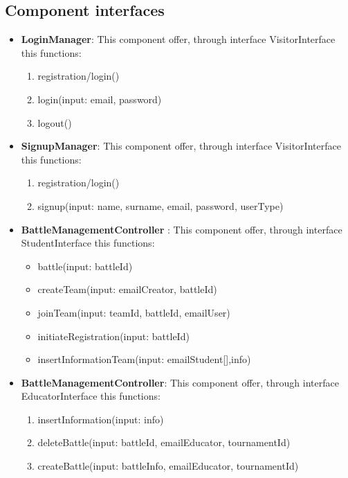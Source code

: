 \subsection{Component interfaces}

\begin{itemize}
    \item \textbf{LoginManager}: This component offer, through interface VisitorInterface this functions:
    \begin{enumerate}
        \item registration/login()
        \item login(input: email, password)
        \item logout()
    \end{enumerate}
    \item \textbf{SignupManager}: This component offer, through interface VisitorInterface this functions:
    \begin{enumerate}
        \item registration/login()
        \item signup(input: name, surname, email, password, userType)
    \end{enumerate}
    \item \textbf{BattleManagementController} : This component offer, through interface StudentInterface this functions:
    \begin{itemize}
        \item battle(input: battleId)
        \item createTeam(input: emailCreator, battleId)
        \item joinTeam(input: teamId, battleId, emailUser)
        \item initiateRegistration(input: battleId)
        \item insertInformationTeam(input: emailStudent[],info)
    \end{itemize}
    \item \textbf{BattleManagementController}: This component offer, through interface EducatorInterface this functions:
    \begin{enumerate}
        \item insertInformation(input: info)
        \item deleteBattle(input: battleId, emailEducator, tournamentId)
         \item createBattle(input: battleInfo, emailEducator, tournamentId)

\end{enumerate}
\end{itemize}
